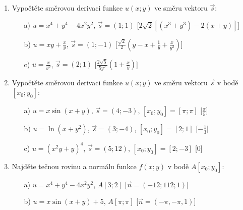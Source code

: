 \begin{enumerate}
\item Vypočtěte směrovou derivaci funkce $u(x;y)$ ve směru vektoru $\vec{s}$:
\begin{enumerate}
\item[a)]{$u=x^4+y^4-4x^2y^2$}, $\vec{s}=(1;1)$
\hspace{\fill}[$2\sqrt{2}[(x^3+y^3) - 2(x+y)]$]
\item[b)]{$u=xy+\frac{x}{y}$}, $\vec{s}=(1;-1)$
\hspace{\fill}[$\frac{\sqrt{2}}{2} (y-x+\frac{1}{y}+\frac{x}{y^2})$]
\item[c)]{$u=\frac{x}{y^2}$}, $\vec{s}=(2;1)$
\hspace{\fill}[$\frac{2\sqrt{5}}{5y^2}(1+\frac{x}{y})$]
\end{enumerate}

\item Vypočtěte směrovou derivaci funkce $u(x;y)$ ve směru vektoru $\vec{s}$ v bodě $[x_0;y_0]$:
\begin{enumerate}
\item[a)]{$u=x\sin(x+y)$}, $\vec{s}=(4;-3)$, $[x_0;y_0]=[\pi;\pi]$
\hspace{\fill}[$\frac{\pi}{5}$]
\item[b)]{$u=\ln(x+y^2)$}, $\vec{s}=(3;-4)$, $[x_0;y_0]=[2;1]$
\hspace{\fill}[$-\frac{1}{3}$]
\item[c)]{$u=(x^2y+y)^4$}, $\vec{s}=(5;12)$, $[x_0;y_0]=[2;-3]$
\hspace{\fill}[$0$]
\end{enumerate}

\item Najděte tečnou rovinu a normálu funkce $f(x;y)$ v bodě $A[x_0;y_0]$:
\begin{enumerate}
\item[a)]{$u=x^4+y^4-4x^2y^2$}, $A[3;2]$
\hspace{\fill}[$\vec{n}=(-12;112;1)$]
\item[b)]{$u=x\sin(x+y)+5$}, $A[\pi;\pi]$
\hspace{\fill}[$\vec{n}=(-\pi,-\pi,1)$]
\end{enumerate}


\end{enumerate}
